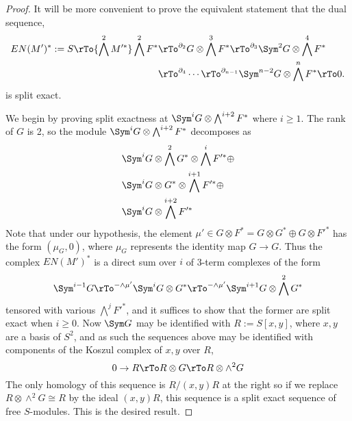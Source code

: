 \begin{proof}
It will be more convenient to prove the equivalent statement that 
the dual sequence,  
\begin{align*}
EN(M')^* := 
S \rTo{\bigwedge^2 M'^*} 
 \bigwedge^2 F^*&
 \rTo^{\partial_{2}}
 G\otimes \bigwedge^3 F^*  
 \rTo^{\partial_{3}}
  \Sym^2G\otimes\bigwedge^4F^*  \\
 &\rTo^{\partial_{4}}\cdots\rTo^{\partial_{n-1}} 
\Sym^{n-2}G\otimes\bigwedge^nF^* 
 \rTo 0.
\end{align*}
is split exact.

We begin by proving split exactness at  
 $\Sym^{i} G \otimes \bigwedge^{i+2}  F^*$ where $i\geq 1$.
The rank of $G$ is 2, so the module
$ \Sym^{i} G \otimes \bigwedge^{i+2}  F^*$
decomposes as
\begin{align*}
&\Sym^{i} G \otimes \bigwedge^2 G^* \otimes \bigwedge^{i} F'^*\oplus \\
&\Sym^{i} G \otimes  G^*\otimes \bigwedge^{i+1} F'^* \oplus \\
&\Sym^{i} G \otimes  \bigwedge^{i+2} F'^* 
\end{align*}
Note that under our hypothesis, the element $\mu' \in G\otimes F^* = G\otimes G^* \oplus G\otimes F'^*$
has the form $(\mu_G, 0)$, where $\mu_G$ represents the identity map $G \to G$. Thus the complex
$EN(M')^*$ is a direct sum over $i$ of 3-term complexes of the form
$$
\Sym^{i-1} G 
\rTo^{-\wedge \mu'} 
\Sym^{i} G \otimes  G^*
\rTo^{-\wedge \mu'} 
\Sym^{i+1} G \otimes \bigwedge^2 G^* 
$$
tensored with various $\bigwedge^j F'^*$, and it suffices to show that the former are split exact when
$i\geq 0$. Now $\Sym G$ may be identified with $R:= S[x,y]$, where $x,y$ are a basis of $S^2$, and
as such the sequences above may be identified with components of the Koszul complex of $x,y$ over $R$,
$$
0\to R \rTo R\otimes G \rTo R\otimes \wedge^2 G
$$
The only homology of this sequence is $R/(x,y)R$ at the right so if we replace  $R\otimes \wedge^2 G \cong R$ by the ideal $(x,y)R$, this sequence is a split exact sequence of free $S$-modules. This is the desired result.


\end{proof}
